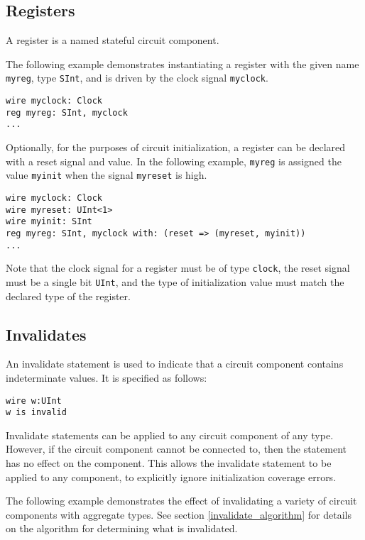 \documentclass[12pt]{article}
\begin{document}
\subsection{Registers}
A register is a named stateful circuit component.

The following example demonstrates instantiating a register with the given name \verb|myreg|, type \verb|SInt|, and is driven by the clock signal \verb|myclock|. 

\begin{lstlisting}
wire myclock: Clock
reg myreg: SInt, myclock
...
\end{lstlisting}

Optionally, for the purposes of circuit initialization, a register can be declared with a reset signal and value. In the following example, \verb|myreg| is assigned the value \verb|myinit| when the signal \verb|myreset| is high.

\begin{lstlisting}
wire myclock: Clock
wire myreset: UInt<1>
wire myinit: SInt
reg myreg: SInt, myclock with: (reset => (myreset, myinit))
...
\end{lstlisting}

Note that the clock signal for a register must be of type \verb|clock|, the reset signal must be a single bit \verb|UInt|, and the type of initialization value must match the declared type of the register.

\subsection{Invalidates}
An invalidate statement is used to indicate that a circuit component contains indeterminate values. It is specified as follows:

\begin{lstlisting}
wire w:UInt
w is invalid
\end{lstlisting}

Invalidate statements can be applied to any circuit component of any type. However, if the circuit component cannot be connected to, then the statement has no effect on the component. This allows the invalidate statement to be applied to any component, to explicitly ignore initialization coverage errors.

The following example demonstrates the effect of invalidating a variety of circuit components with aggregate types. See section \ref{invalidate_algorithm} for details on the algorithm for determining what is invalidated.
\end{document}
